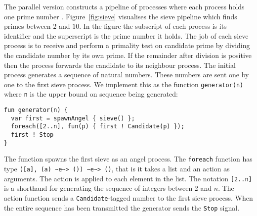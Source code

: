 \documentclass[12pt,mscres,cdtppar,twoside,openright,logo,rightchapter,normalheadings]{infthesis}
\theoremstyle{definition}
\begin{document}
The parallel version constructs a pipeline of processes where each
process holds one prime number
\citep{Andrews2000}. Figure~\ref{fig:sieve} visualises the sieve
pipeline which finds primes between $2$ and $10$. In the figure the
subscript of each process is its identifier and the superscript is the
prime number it holds. The job of each sieve process is to receive and
perform a primality test on candidate prime by dividing the candidate
number by its own prime. If the remainder after division is positive
then the process forwards the candidate to its neighbour process. The
initial process generates a sequence of natural numbers. These numbers
are sent one by one to the first sieve process. We implement this as
the function \lstinline$generator(n)$ where \lstinline$n$ is the upper
bound on sequence being generated:
%
\begin{lstlisting}
fun generator(n) {
  var first = spawnAngel { sieve() };
  foreach([2..n], fun(p) { first ! Candidate(p) });
  first ! Stop
}
\end{lstlisting}
%
The function spawns the first sieve as an angel process. The
\lstinline$foreach$ function has type
\lstinline$([a], (a) ~e~> ()) ~e~> ()$, that is it takes a list and an
action as arguments. The action is applied to each element in the
list. The notation \lstinline$[2..n]$ is a shorthand for generating
the sequence of integers between $2$ and $n$. The action function
sends a \lstinline$Candidate$-tagged number to the first sieve
process. When the entire sequence has been transmitted the generator
sends the \lstinline$Stop$ signal.
\end{document}
